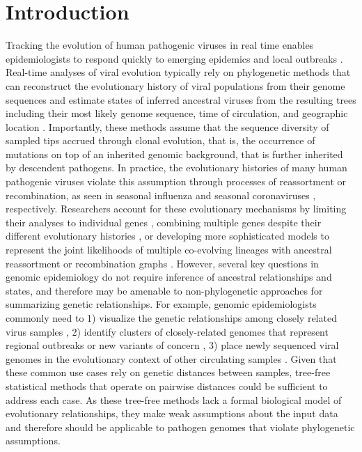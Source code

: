 \documentclass[webpdf,contemporary,large,single]{oup-authoring-template}%
\theoremstyle{thmstyleone}%
\theoremstyle{thmstyletwo}%
\theoremstyle{thmstylethree}%
\begin{document}
\section{Introduction}

Tracking the evolution of human pathogenic viruses in real time enables epidemiologists to respond quickly to emerging epidemics and local outbreaks \citep{Grubaugh2019}.
Real-time analyses of viral evolution typically rely on phylogenetic methods that can reconstruct the evolutionary history of viral populations from their genome sequences and estimate states of inferred ancestral viruses from the resulting trees including their most likely genome sequence, time of circulation, and geographic location \citep{Volz2013,Baele2017,Sagulenko2018}.
Importantly, these methods assume that the sequence diversity of sampled tips accrued through clonal evolution, that is, the occurrence of mutations on top of an inherited genomic background, that is further inherited by descendent pathogens.
In practice, the evolutionary histories of many human pathogenic viruses violate this assumption through processes of reassortment or recombination, as seen in seasonal influenza \citep{Nelson2008,Marshall2013} and seasonal coronaviruses \citep{Su2016}, respectively.
Researchers account for these evolutionary mechanisms by limiting their analyses to individual genes \citep{Lemey2007,Bhatt2011}, combining multiple genes despite their different evolutionary histories \citep{Wiens1998}, or developing more sophisticated models to represent the joint likelihoods of multiple co-evolving lineages with ancestral reassortment or recombination graphs \citep{Barrat-Charlaix2022,Muller2022}.
However, several key questions in genomic epidemiology do not require inference of ancestral relationships and states, and therefore may be amenable to non-phylogenetic approaches for summarizing genetic relationships.
For example, genomic epidemiologists commonly need to 1) visualize the genetic relationships among closely related virus samples \citep{Argimon2016,Campbell2021}, 2) identify clusters of closely-related genomes that represent regional outbreaks or new variants of concern \citep{OToole2022,McBroome2022,Stoddard2022,Tran-Kiem2023}, 3) place newly sequenced viral genomes in the evolutionary context of other circulating samples \citep{OToole2021,Turakhia2021,Aksamentov2021}.
Given that these common use cases rely on genetic distances between samples, tree-free statistical methods that operate on pairwise distances could be sufficient to address each case.
As these tree-free methods lack a formal biological model of evolutionary relationships, they make weak assumptions about the input data and therefore should be applicable to pathogen genomes that violate phylogenetic assumptions.
\end{document}
